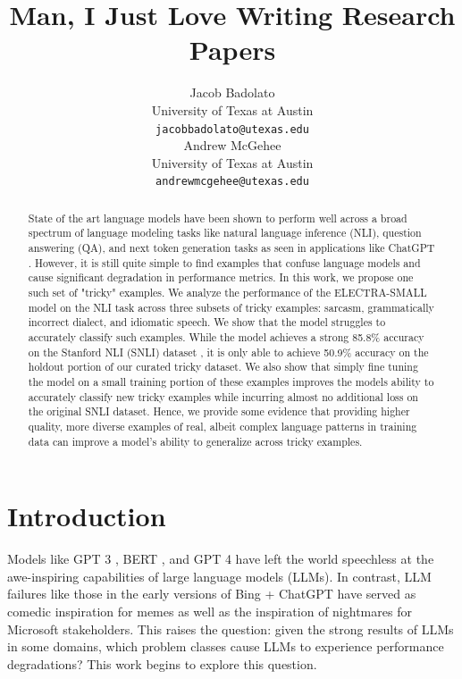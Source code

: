 \documentclass{article}
\title{Man, I Just Love Writing Research Papers}
\author{%
  Jacob Badolato \\
  University of Texas at Austin \\
  \texttt{jacobbadolato@utexas.edu} \\
  \And
  Andrew McGehee \\
  University of Texas at Austin \\
  \texttt{andrewmcgehee@utexas.edu} \\
}
\begin{document}
\maketitle

\begin{abstract}
	State of the art language models have been shown to perform well across a broad spectrum of language modeling tasks like natural language inference (NLI), question answering (QA), and next token generation tasks as seen in applications like ChatGPT \cite{naveed2023comprehensive}. However, it is still quite simple to find examples that confuse language models and cause significant degradation in performance metrics. In this work, we propose one such set of "tricky" examples. We analyze the performance of the ELECTRA-SMALL model \cite{clark2020electra} on the NLI task \cite{bowman-etal-2015-large} across three subsets of tricky examples: sarcasm, grammatically incorrect dialect, and idiomatic speech. We show that the model struggles to accurately classify such examples. While the model achieves a strong 85.8\% accuracy on the Stanford NLI (SNLI) dataset \cite{bowman-etal-2015-large}, it is only able to achieve 50.9\% accuracy on the holdout portion of our curated tricky dataset. We also show that simply fine tuning the model on a small training portion of these examples improves the models ability to accurately classify new tricky examples while incurring almost no additional loss on the original SNLI dataset. Hence, we provide some evidence that providing higher quality, more diverse examples of real, albeit complex language patterns in training data can improve a model's ability to generalize across tricky examples.
\end{abstract}

\section{Introduction}
Models like GPT 3 \cite{brown2020language}, BERT \cite{devlin2019bert}, and \cite{openai2023gpt4} GPT 4 have left the world speechless at the awe-inspiring
capabilities of large language models (LLMs). In contrast, LLM failures like those in the early versions of Bing + ChatGPT
have served as comedic inspiration for memes as well as the inspiration of nightmares for Microsoft stakeholders. This
raises the question: given the strong results of LLMs in some domains, which problem classes cause LLMs to experience
performance degradations? This work begins to explore this question.
\end{document}
